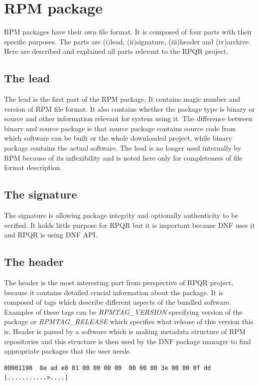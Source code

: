 \section{RPM package}
RPM packages have their own file format\cite{RPMFileFormat}. It is composed of four parts with their specific purposes.
The parts are (i)lead, (ii)signature, (iii)header and (iv)archive. Here are described and explained all parts
relevant to the RPQR project.

\subsection*{The lead}
The lead is the first part of the RPM package. It contains magic number and version of RPM file format.
It also contains whether the package type is binary or source and other information relevant
for system using it. The difference between binary and source package is that source package contains
source code from which software can be built or the whole downloaded project, while binary package
contains the actual software. The lead is no longer used internally by RPM because of its
inflexibility and is noted here only for completeness of file format description.

\subsection*{The signature}
The signature is allowing package integrity and optionally authenticity to be verified. It holds
little purpose for RPQR but it is important because DNF uses it and RPQR is using DNF API.

\subsection*{The header}
The header is the most interesting part from perspective of RPQR project, because it contains
detailed crucial information about the package. It is composed of tags which describe different
aspects of the bundled software. Examples of these tags can be \mbox{\textit{RPMTAG\_VERSION}}
specifying version of the package or \textit{RPMTAG\_RELEASE} which specifies what release of
this version this is. Header is parsed by a software which is making metadata structure of RPM
repositories and this structure is then used by the DNF package manager to find appropriate
packages that the user needs.

\begin{lstlisting}
00001198  8e ad e8 01 00 00 00 00  00 00 00 3e 00 00 0f dd  |...........>....|
\end{lstlisting}

